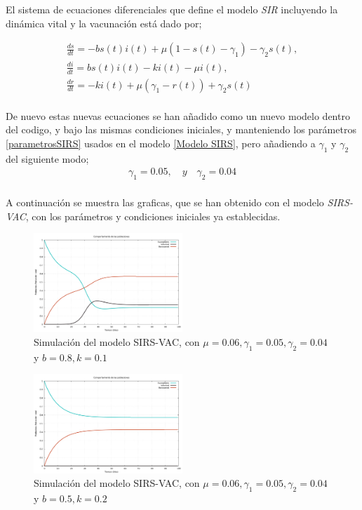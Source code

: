 \documentclass[journal]{IEEEtran}
\begin{document}
El sistema de ecuaciones diferenciales que define el modelo \textit{SIR} incluyendo la dinámica vital y
la vacunación \cite{SIRS-VAC} está dado por;

\begin{equation}\label{SIRS-VAC}
  \begin{split}
    \frac{ds}{dt} = -bs(t)i(t) + \mu (1 - s(t) -\gamma_1) - \gamma_2 s(t),\\
    \frac{di}{dt} = bs(t)i(t)-ki(t)-\mu i(t),\\
    \frac{dr}{dt} = -ki(t) + \mu (\gamma_1 - r(t)) + \gamma_2 s(t) \\
  \end{split}
\end{equation}

De nuevo estas nuevas ecuaciones se han añadido como un nuevo modelo dentro del codigo, y bajo las mismas condiciones iniciales,
y manteniendo los parámetros \ref{parametrosSIRS} usados en el modelo \ref{Modelo SIRS}, pero añadiendo a $\gamma_1$ y $\gamma_2$ del siguiente modo;
\begin{equation}
	\begin{split}
		\gamma_1 = 0.05, \quad y \quad \gamma_2 = 0.04\\
	\end{split}
\end{equation}

A continuación se muestra las graficas, que se han obtenido con el modelo \textit{SIRS-VAC}, con los parámetros 
y condiciones iniciales ya establecidas. 
\begin{figure}[H]
	\centering
	\includegraphics[width=0.5\textwidth]{SIRS/graph-1-SIRSV}
	\caption{Simulación del modelo SIRS-VAC, con $\mu = 0.06, \gamma_1 = 0.05, \gamma_2 = 0.04$ y $b = 0.8, k = 0.1$}
	\label{fig:SIRS-VAC1}
\end{figure}
\begin{figure}[H]
	\centering
	\includegraphics[width=0.5\textwidth]{SIRS/graph-2-SIRSV}
	\caption{Simulación del modelo SIRS-VAC, con $\mu = 0.06, \gamma_1 = 0.05, \gamma_2 = 0.04$ y $b = 0.5, k = 0.2$}
	\label{fig:SIRS-VAC2}
\end{figure}
\end{document}
